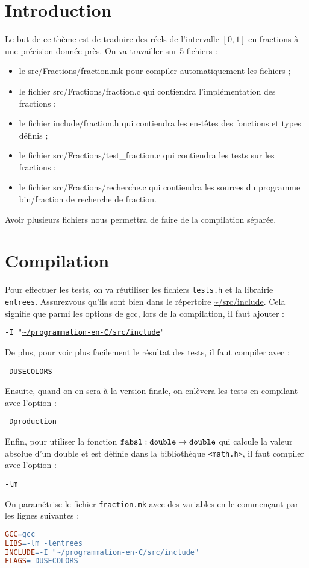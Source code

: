 

\section{Introduction}


Le but de ce thème est de traduire des réels de l’intervalle \([0,
1]\) en fractions à une précision donnée près. On va travailler sur 5
fichiers :
\begin{itemize}
\item le src/Fractions/fraction.mk pour compiler automatiquement
  les fichiers ;
\item le fichier src/Fractions/fraction.c qui contiendra
  l’implémentation des fractions ;
\item le fichier include/fraction.h qui contiendra les en-têtes des
  fonctions et types définis ;
\item le fichier src/Fractions/test_fraction.c qui contiendra les
  tests sur les fractions ;
\item le fichier src/Fractions/recherche.c qui contiendra les sources
  du programme bin/fraction de recherche de fraction.
\end{itemize}
Avoir plusieurs fichiers nous permettra de faire de la compilation séparée.


\section{Compilation}

Pour effectuer les tests, on va réutiliser les fichiers \texttt{tests.h} et la librairie \texttt{entrees}. Assurezvous qu’ils sont bien dans le répertoire \url{~/src/include}. Cela signifie que parmi les options de
gcc, lors de la compilation, il faut ajouter :
\begin{center}
  \tt -I "\url{~/programmation-en-C/src/include}"
\end{center}
De plus, pour voir plus facilement le résultat des tests, il faut compiler avec :
\begin{center}
  \tt -DUSECOLORS
\end{center}
Ensuite, quand on en sera à la version finale, on enlèvera les tests en compilant avec l’option :
\begin{center}
  \tt -Dproduction
\end{center}
Enfin, pour utiliser la fonction \(\text{\tt fabsl} : \text{\tt
  double} \rightarrow \text{\tt double}\) qui calcule la valeur
absolue d’un double et est définie dans la bibliothèque
\texttt{<math.h>}, il faut compiler avec l’option : 
\begin{center}
  \tt -lm
\end{center}
 On paramétrise
le fichier  \texttt{fraction.mk} avec des variables en le commençant par les lignes
suivantes : 
\begin{lstlisting}[language=make]
GCC=gcc 
LIBS=-lm -lentrees 
INCLUDE=-I "~/programmation-en-C/src/include" 
FLAGS=-DUSECOLORS 
\end{lstlisting}


